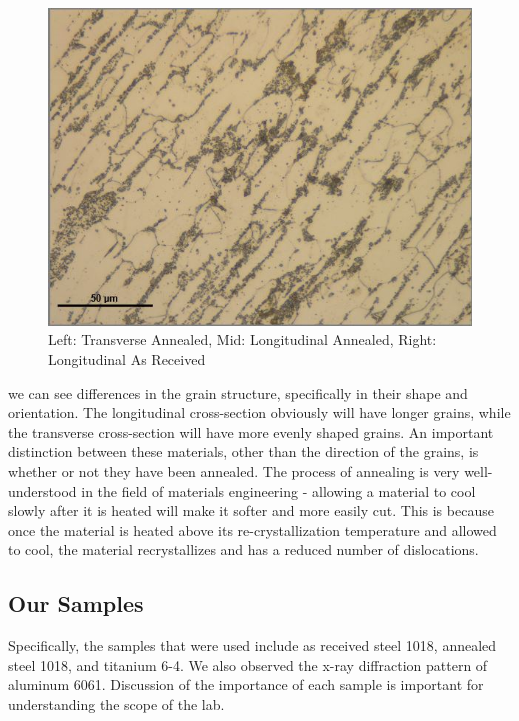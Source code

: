 \documentclass{article}
\begin{document}
\begin{figure}[h]
\begin{minipage}{0.32\textwidth}
	\end{minipage}
	\begin{minipage}{0.32\textwidth}
		\centering
		\includegraphics[scale=.28]{LongARSteel.png}
	\end{minipage}
	\caption{Left: Transverse Annealed, Mid: Longitudinal Annealed, Right: Longitudinal As Received}
\end{figure}

we can see differences in the grain structure, specifically in their shape and orientation. The longitudinal cross-section obviously will have longer grains, while the transverse cross-section will have more evenly shaped grains. An important distinction between these materials, other than the direction of the grains, is whether or not they have been annealed. The process of annealing is very well-understood in the field of materials engineering - allowing a material to cool slowly after it is heated will make it softer and more easily cut. This is because once the material is heated above its re-crystallization temperature and allowed to cool, the material recrystallizes and has a reduced number of dislocations.

\subsection{Our Samples}

Specifically, the samples that were used include as received steel 1018, annealed steel 1018, and titanium 6-4. We also observed the x-ray diffraction pattern of aluminum 6061. Discussion of the importance of each sample is important for understanding the scope of the lab.
\end{document}
